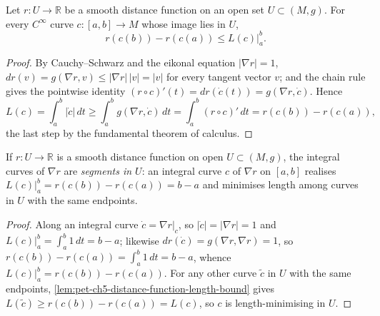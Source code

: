 \begin{lemma}
  \label{lem:pet-ch5-distance-function-length-bound}
  \leanok
  Let $r:U\to\mathbb R$ be a smooth distance function on an open set
  $U\subset(M,g)$. For every $C^\infty$ curve $c:[a,b]\to M$ whose image lies in
  $U$,
  \[
    r(c(b))-r(c(a))\le L(c)|_a^b.
  \]
\end{lemma}
\begin{proof}
  \leanok
  By Cauchy–Schwarz and the eikonal equation $|\nabla r|=1$,
  $dr(v)=g(\nabla r,v)\le|\nabla r|\,|v|=|v|$ for every tangent vector $v$; and
  the chain rule gives the pointwise identity $(r\circ c)'(t)=dr(\dot c(t))
  =g(\nabla r,\dot c)$. Hence
  \[
    L(c)=\int_a^b|\dot c|\,dt\ge\int_a^b g(\nabla r,\dot c)\,dt
      =\int_a^b (r\circ c)'\,dt=r(c(b))-r(c(a)),
  \]
  the last step by the fundamental theorem of calculus.
\end{proof}

\begin{lemma}
  \label{lem:pet-ch5-distance-function-segments}
  \leanok
  If $r:U\to\mathbb R$ is a smooth distance function on open $U\subset(M,g)$, the
  integral curves of $\nabla r$ are \emph{segments in $U$}: an integral curve $c$
  of $\nabla r$ on $[a,b]$ realises $L(c)|_a^b=r(c(b))-r(c(a))=b-a$ and minimises
  length among curves in $U$ with the same endpoints.
\end{lemma}
\begin{proof}
  \leanok
  Along an integral curve $\dot c=\nabla r|_c$, so $|\dot c|=|\nabla r|=1$ and
  $L(c)|_a^b=\int_a^b 1\,dt=b-a$; likewise $dr(\dot c)=g(\nabla r,\nabla r)=1$, so
  $r(c(b))-r(c(a))=\int_a^b 1\,dt=b-a$, whence $L(c)|_a^b=r(c(b))-r(c(a))$. For
  any other curve $\tilde c$ in $U$ with the same endpoints,
  \cref{lem:pet-ch5-distance-function-length-bound} gives $L(\tilde c)\ge
  r(c(b))-r(c(a))=L(c)$, so $c$ is length-minimising in $U$.
\end{proof}

